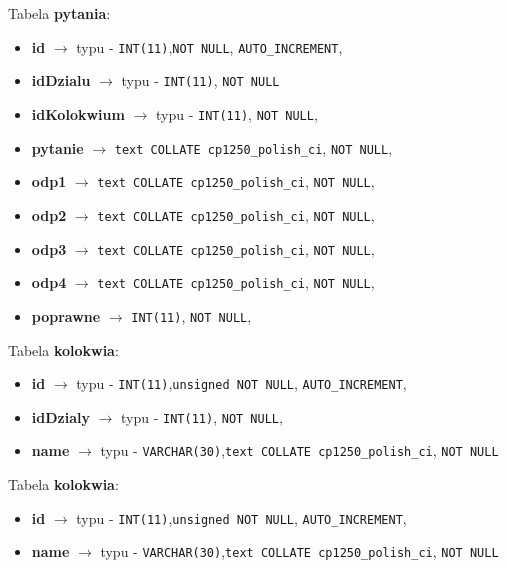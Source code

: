 \documentclass[a4paper]{article}
\begin{document}
				\vspace{0.5cm}
				Tabela \textbf{pytania}:
				\begin{itemize}
					\item \textbf{id} $\to$ typu - \verb|INT(11)|,\verb|NOT NULL|, \verb|AUTO_INCREMENT|,
					\item \textbf{idDzialu} $\to$ typu - \verb|INT(11)|, \verb|NOT NULL| 
					\item \textbf{idKolokwium} $\to$ typu - \verb|INT(11)|, \verb|NOT NULL|,
					\item \textbf{pytanie} $\to$  \verb|text COLLATE cp1250_polish_ci|, \verb|NOT NULL|,
					\item \textbf{odp1} $\to$  \verb|text COLLATE cp1250_polish_ci|, \verb|NOT NULL|,
					\item \textbf{odp2} $\to$  \verb|text COLLATE cp1250_polish_ci|, \verb|NOT NULL|,
					\item \textbf{odp3} $\to$  \verb|text COLLATE cp1250_polish_ci|, \verb|NOT NULL|,
					\item \textbf{odp4} $\to$  \verb|text COLLATE cp1250_polish_ci|, \verb|NOT NULL|,
					\item \textbf{poprawne} $\to$  \verb|INT(11)|, \verb|NOT NULL|,
				\end{itemize}
				
				\vspace{0.5cm}
				Tabela \textbf{kolokwia}:
				\begin{itemize}
					\item \textbf{id} $\to$ typu - \verb|INT(11)|,\verb|unsigned NOT NULL|, \verb|AUTO_INCREMENT|,
					\item \textbf{idDzialy} $\to$ typu - \verb|INT(11)|, \verb|NOT NULL|,
					\item \textbf{name} $\to$ typu - \verb|VARCHAR(30)|,\verb|text COLLATE cp1250_polish_ci|, \verb|NOT NULL| 
					\end{itemize}				
					
				\vspace{0.5cm}
				Tabela \textbf{kolokwia}:
				\begin{itemize}
					\item \textbf{id} $\to$ typu - \verb|INT(11)|,\verb|unsigned NOT NULL|, \verb|AUTO_INCREMENT|,
					\item \textbf{name} $\to$ typu - \verb|VARCHAR(30)|,\verb|text COLLATE cp1250_polish_ci|, \verb|NOT NULL| 
					\end{itemize}									
		
		 
\end{document}

